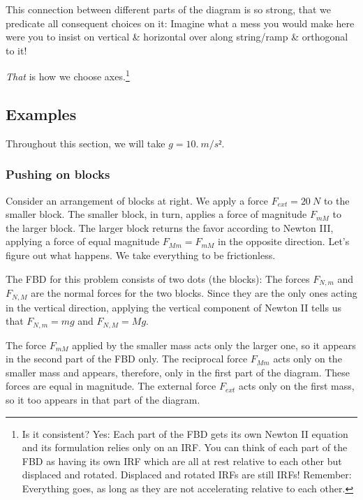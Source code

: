 This connection between different parts of the diagram is so strong, that we predicate all consequent choices on it: Imagine what a mess you would make here were you to insist on vertical \& horizontal over along string/ramp \& orthogonal to it! 

{\em That} is how we choose axes.\footnote{Is it consistent? Yes: Each part of the FBD gets its own Newton II equation and its formulation relies only on an IRF. You can think of each part of the FBD as having its own IRF which are all at rest relative to each other but displaced and rotated. Displaced and rotated IRFs are still IRFs! Remember: Everything goes, as long as they are not accelerating relative to each other.}


\subsection{Examples}
Throughout this section, we will take $g = 10.\ m/s²$.

\subsubsection{Pushing on blocks}
Consider an arrangement of blocks at right. We apply a force $F_{ext}= 20\ N$ to the smaller block. The smaller block, in turn, applies a force of magnitude $F_{mM}$ to the larger block. The larger block returns the favor according to Newton III, applying a force of equal magnitude $F_{Mm}=F_{mM}$ in the opposite direction. Let's figure out what happens. We take everything to be frictionless. 

The FBD for this problem consists of two dots (the blocks):
The forces $F_{N,m}$ and $F_{N,M}$ are the normal forces for the two blocks. Since they are the only ones acting in the vertical direction, applying the vertical component of Newton II tells us that 
$F_{N,m} = mg$ and $F_{N,M} = Mg$. 

The force $F_{mM}$ applied by the smaller mass acts only the larger one, so it appears in the second part of the FBD only. The reciprocal force $F_{Mm}$ acts only on the smaller mass and appears, therefore, only in the first part of the diagram. These forces are equal in magnitude. The external force $F_{ext}$ acts only on the first mass, so it too appears in that part of the diagram. 

